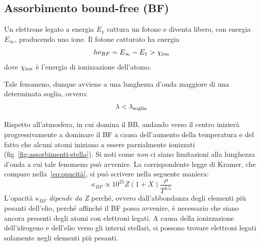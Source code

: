 \subsection{Assorbimento bound-free (BF)}\label{sec:bound-free}
Un elettrone legato a energia $E_1$ cattura un fotone e diventa libero, con energia $E_\infty$, producendo uno ione. Il fotone catturato ha energia
\begin{equation}
    h \nu_{BF} = E_\infty - E_1 > \chi_\textup{ion}
\end{equation}
dove $\chi_\textup{ion}$ è l'energia di ionizzazione dell'atomo. 

Tale fenomeno, dunque avviene a una lunghezza d'onda maggiore di una determinata soglia, ovvero:
\begin{equation}\label{eq:lunghezza-BF}
    \lambda < \lambda_\textup{soglia}
\end{equation}

Rispetto all'atmosfera, in cui domina il BB, andando verso il centro inizierà progressivamente a dominare il BF a causa dell'aumento della temperatura e del fatto che  alcuni atomi iniziano a essere parzialmente ionizzati (fig~\ref{fig:assorbimenti-stella}). Si noti come \emph{non} ci siano limitazioni alla lunghezza d'onda a cui tale fenomeno può avvenire. La corrispondente legge di Kramer, che compare nella~\eqref{eq:opacità}, si può scrivere nella seguente maniera:
\begin{equation}
    \kappa_{BF} \propto 10^{25} Z (1+X) \dfrac{\rho}{T^{3.5}}
\end{equation}
L'opacità $\kappa_{BF}$ \emph{dipende da Z} perché, ovvero dall'abbondanza degli elementi più pesanti dell'elio, perché affinché il BF possa avvenire, è necessario che siano ancora presenti degli atomi con elettroni legati. A causa della ionizzazione dell'idrogeno e dell'elio verso gli interni stellari, si possono trovare elettroni legati solamente negli elementi più pesanti.

